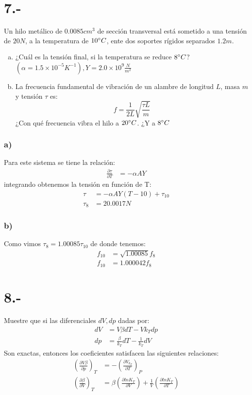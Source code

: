 \documentclass{article}
\begin{document}
\section*{7.-}
Un hilo metálico de $0.0085cm^3$ de sección transversal está sometido a una tensión de 
$20N$, a la temperatura de $10\degree C$, ente dos soportes rígidos separados $1.2m$. 
\begin{enumerate}[a)]
    \item ¿Cuál es la tensión final, si la temperatura se reduce $8\degree C$?
    $(\alpha = 1.5 \times 10^{-5}K^{-1}), Y = 2.0 \times 10^9 \frac{N}{m^2}$

    \item La frecuencia fundamental de vibración de un alambre de longitud $L$, 
    masa $m$ y tensión $\tau$ es:
    \[ f = \frac{1}{2L} \sqrt{\frac{\tau L}{m}} \]
    ¿Con qué frecuencia vibra el hilo a $20\degree C$. ¿Y a $8\degree C$
\end{enumerate}
\begin{tcolorbox}[breakable]
    \subsubsection*{a)}
    Para este sistema se tiene la relación:
    \begin{align*}
        \frac{\partial \tau}{\partial T} &= -\alpha A Y
    \end{align*}
    integrando obtenemos la tensión en función de T:
    \begin{align*}
        \tau  &= -\alpha A Y (T-10) + \tau_{10} \\ 
        \tau_8 &= 20.0017N
    \end{align*}
    \subsubsection*{b)}
    Como vimos $\tau_8 = 1.00085\tau_{10}$ de donde tenemos:
    \begin{align*}
        f_{10} &= \sqrt{1.00085}f_8\\ 
        f_{10} &= 1.000042f_8 
    \end{align*}
\end{tcolorbox}

\section*{8.-}
Muestre que si las diferenciales $dV, dp$ dadas por:
\begin{align*}
    dV &= V\beta dT - Vk_T dp \\
    dp &= \frac{\beta}{k_T} dT - \frac{1}{k_T}dV
\end{align*}
Son exactas, entonces los coeficientes satisfacen las siguientes relaciones:
\begin{align*}
    \left( \frac{\partial V \beta}{\partial p} \right)_T
    &=-\left( \frac{\partial V_{k_T}}{\partial T} \right)_P \\
     \left( \frac{\partial \beta}{\partial V} \right)_T
    &=\beta \left( \frac{\partial lnK_T}{\partial V} \right) 
    + \frac{1}{V}\left( \frac{\partial lnK_T}{\partial T} \right)
\end{align*}
\end{document}
